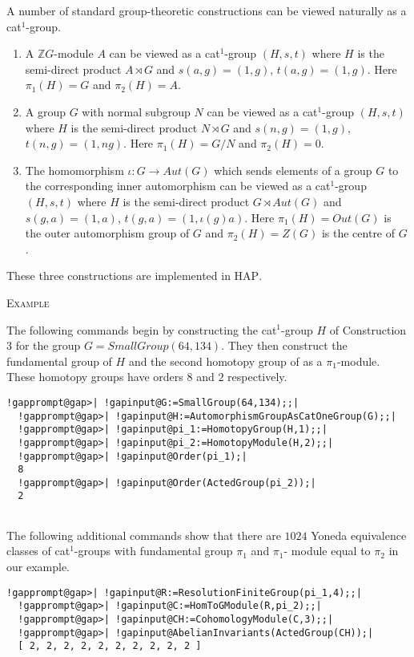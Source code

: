 \documentclass[a4paper,11pt]{report}
\begin{document}
{{A number of standard group-theoretic constructions can be viewed naturally as
a cat$^1$-group. 
\begin{enumerate}
\item  A $\mathbb ZG$-module $A$ can be viewed as a cat$^1$-group $(H,s,t)$ where $H$ is the semi-direct product $A\rtimes G$ and $s(a,g)=(1,g)$, $t(a,g)=(1,g)$. Here $\pi_1(H)=G$ and $\pi_2(H)=A$.
\item  A group $G$ with normal subgroup $N$ can be viewed as a cat$^1$-group $(H,s,t)$ where $H$ is the semi-direct product $N\rtimes G$ and $s(n,g)=(1,g)$, $t(n,g)=(1,ng)$. Here $\pi_1(H)=G/N$ and $\pi_2(H)=0$.
\item  The homomorphism $\iota \colon G\rightarrow Aut(G)$ which sends elements of a group $G$ to the corresponding inner automorphism can be viewed as a cat$^1$-group $(H,s,t)$ where $H$ is the semi-direct product $G\rtimes Aut(G)$ and $s(g,a)=(1,a)$, $t(g,a)=(1,\iota (g)a)$. Here $\pi_1(H)=Out(G)$ is the outer automorphism group of $G$ and $\pi_2(H)=Z(G)$ is the centre of $G$.
\end{enumerate}
 These three constructions are implemented in \textsc{HAP}. 

\textsc{Example} 

The following commands begin by constructing the cat$^1$-group $H$ of Construction 3 for the group $G=SmallGroup(64,134)$. They then construct the fundamental group of $H$ and the second homotopy group of as a $\pi_1$-module. These homotopy groups have orders $8$ and $2$ respectively. 
\begin{Verbatim}[commandchars=!@|,fontsize=\small,frame=single,label=Example]
  !gapprompt@gap>| !gapinput@G:=SmallGroup(64,134);;|
  !gapprompt@gap>| !gapinput@H:=AutomorphismGroupAsCatOneGroup(G);;|
  !gapprompt@gap>| !gapinput@pi_1:=HomotopyGroup(H,1);;|
  !gapprompt@gap>| !gapinput@pi_2:=HomotopyModule(H,2);;|
  !gapprompt@gap>| !gapinput@Order(pi_1);|
  8
  !gapprompt@gap>| !gapinput@Order(ActedGroup(pi_2));|
  2
  
\end{Verbatim}
 

 The following additional commands show that there are $1024$ Yoneda equivalence classes of cat$^1$-groups with fundamental group $\pi_1$ and $\pi_1$- module equal to $\pi_2$ in our example. 
\begin{Verbatim}[commandchars=!@|,fontsize=\small,frame=single,label=Example]
  !gapprompt@gap>| !gapinput@R:=ResolutionFiniteGroup(pi_1,4);;|
  !gapprompt@gap>| !gapinput@C:=HomToGModule(R,pi_2);;|
  !gapprompt@gap>| !gapinput@CH:=CohomologyModule(C,3);;|
  !gapprompt@gap>| !gapinput@AbelianInvariants(ActedGroup(CH));|
  [ 2, 2, 2, 2, 2, 2, 2, 2, 2, 2 ]
  

\end{Verbatim}}}
\end{document}
